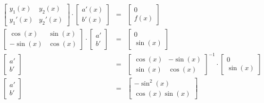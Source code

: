 \documentclass[a4paper]{article}
\begin{document}
	\begin{equation*}
		\begin{array}{rcl}
			\begin{bmatrix}
				y_{1}\left(x\right) & y_{2}\left(x\right) \\
				y_{1}'\left(x\right) & y_{2}'\left(x\right)
			\end{bmatrix}
			\cdot
			\begin{bmatrix}
				a'\left(x\right) \\
				b'\left(x\right)
			\end{bmatrix}
			&=&
			\begin{bmatrix}
				0 \\
				f\left(x\right)
			\end{bmatrix} \\ [1em]
			\begin{bmatrix}
				\cos\left(x\right) & \sin\left(x\right) \\
				-\sin\left(x\right) & \cos\left(x\right)
			\end{bmatrix}
			\cdot
			\begin{bmatrix}
				a' \\ b'
			\end{bmatrix}
			&=&
			\begin{bmatrix}
				0 \\ \sin\left(x\right)
			\end{bmatrix} \\ [.8em]
			\begin{bmatrix}
				a' \\ b'
			\end{bmatrix}
			&=&
			\begin{bmatrix}
				\cos\left(x\right) & -\sin\left(x\right) \\
				\sin\left(x\right) & \cos\left(x\right)
			\end{bmatrix}^{-1}
			\cdot
			\begin{bmatrix}
				0 \\ \sin\left(x\right)
			\end{bmatrix} \\ [1em]
			\begin{bmatrix}
				a' \\ b'
			\end{bmatrix}
			&=&
			\begin{bmatrix}
				- \sin^{2}\left(x\right) \\
				\cos\left(x\right) \sin\left(x\right)
			\end{bmatrix}
		\end{array}
	\end{equation*}\newpage
\end{document}

